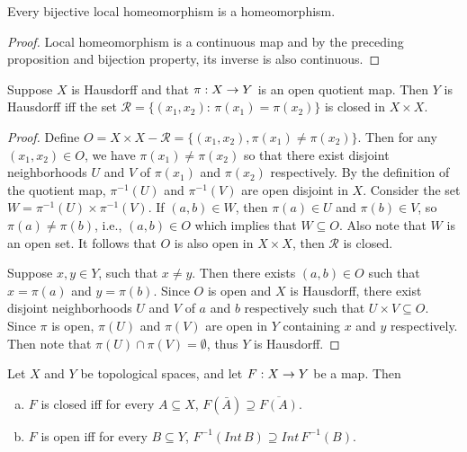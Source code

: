\documentclass[11pt,a4paper]{article}
\begin{document}
\begin{prop}
Every bijective local homeomorphism is a homeomorphism.
\end{prop}

\begin{proof}
Local homeomorphism is a continuous map and by the preceding proposition and bijection property, its inverse is also continuous.
\end{proof}

\begin{prop}
Suppose $X$ is Hausdorff and that $\pi:X\rightarrow Y$ is an open quotient map. Then $Y$ is Hausdorff iff the set $\mathcal{R} = \{(x_1,x_2):\,\pi(x_1) = \pi(x_2)\}$ is closed in $X\times X$.
\end{prop}

\begin{proof}
\forward Define $O = X\times X - \mathcal{R} = \{(x_1, x_2), \pi(x_1) \neq \pi(x_2)\}$. Then for any $(x_1,x_2)\in O$, we have $\pi(x_1) \neq \pi(x_2)$ so that there exist disjoint neighborhoods $U$ and $V$ of $\pi(x_1)$ and $\pi(x_2)$ respectively. By the definition of the quotient map, $\pi^{-1}(U)$ and $\pi^{-1}(V)$ are open disjoint in $X$. Consider the set $W = \pi^{-1}(U) \times \pi^{-1}(V)$. If $(a,b)\in W$, then $\pi(a)\in U$ and $\pi(b)\in V$, so $\pi(a)\neq \pi(b)$, i.e., $(a,b)\in O$ which implies that $W\subseteq O$. Also note that $W$ is an open set. It follows that $O$ is also open in $X\times X$, then $\mathcal{R}$ is closed.

\converse Suppose $x,y\in Y$, such that $x\neq y$. Then there exists $(a,b)\in O$ such that $x = \pi(a)$ and $y = \pi(b)$. Since $O$ is open and $X$ is Hausdorff, there exist disjoint neighborhoods $U$ and $V$ of $a$ and $b$ respectively such that $U \times V \subseteq O$. Since $\pi$ is open, $\pi(U)$ and $\pi(V)$ are open in $Y$ containing $x$ and $y$ respectively. Then note that $\pi(U)\cap \pi(V)=\emptyset$, thus $Y$ is Hausdorff.
\end{proof}

\begin{prop}
Let $X$ and $Y$ be topological spaces, and let $F:X\rightarrow Y$ be a map. Then 
\begin{enumerate}[(a)]
    \item $F$ is closed iff for every $A\subseteq X$, $F(\bar{A})\supseteq \overline{F(A)}$.
    \item $F$ is open iff for every $B\subseteq Y$, $F^{-1}(Int\,B)\supseteq Int\, F^{-1}(B)$.
\end{enumerate}
\end{prop}
\end{document}
